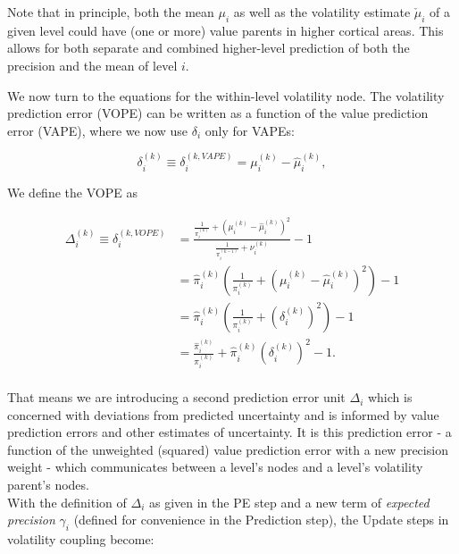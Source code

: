 
Note that in principle, both the mean $\mu_i$ as well as the volatility estimate $\check{\mu}_i$ of a given level could have (one or more) value parents in higher cortical areas. This allows for both separate and combined higher-level prediction of both the precision and the mean of level $i$.

We now turn to the equations for the within-level volatility node. The volatility prediction error (\textsf{VOPE}) can be written as a function of the value prediction error (\textsf{VAPE}), where we now use $\delta_i$ only for \textsf{VAPE}s:

\begin{equation}
	\delta_i^{(k)} \equiv \delta_i^{(k, VAPE)} = \mu_i^{(k)} - \hat{\mu}_i^{(k)},
\end{equation}

We define the \textsf{VOPE} as 

\begin{equation}
  \begin{split}
    \Delta_i^{(k)} \equiv \delta_i^{(k, VOPE)} &= \frac{ \frac{1}{\pi_{i}^{(k)}} + (\mu_i^{(k)} - \hat{\mu}_i^{(k)})^2 }{ \frac{1}{\pi_{i}^{(k-1)}} + \nu_{i}^{(k)} } - 1 \\
    &= \hat{\pi}_i^{(k)} \left( \frac{1}{\pi_{i}^{(k)}} + (\mu_i^{(k)} - \hat{\mu}_i^{(k)})^2 \right) - 1 \\
    &= \hat{\pi}_i^{(k)} \left( \frac{1}{\pi_{i}^{(k)}} + (\delta_i^{(k)})^2 \right) - 1 \\
    &=  \frac{\hat{\pi}_i^{(k)}}{\pi_{i}^{(k)}} + \hat{\pi}_i^{(k)} (\delta_i^{(k)})^2 - 1. \\
  \end{split} 
\end{equation}

That means we are introducing a second prediction error unit $\Delta_i$ which is concerned with deviations from predicted uncertainty and is informed by value prediction errors and other estimates of uncertainty. It is this prediction error - a function of the unweighted (squared) value prediction error with a new precision weight - which communicates between a level's nodes and a level's volatility parent's nodes.\\

With the definition of $\Delta_i$ as given in the \textsf{PE} step and a new term of \textit{expected precision} $\gamma_i$ (defined for convenience in the \textsf{Prediction} step), the \textsf{Update} steps in volatility coupling become:

